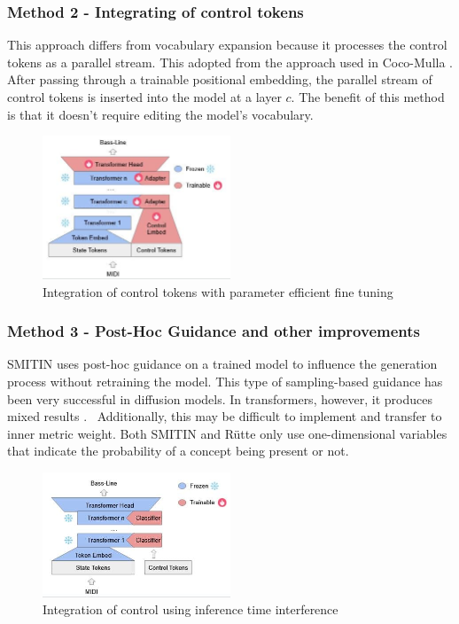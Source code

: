 \subsubsection{Method 2 - Integrating of control tokens} 

This approach differs from vocabulary expansion because it processes the control tokens as a parallel stream. This adopted from the approach used in Coco-Mulla \cite{Lin_cocomulla_2024}. After passing through a trainable positional embedding, the parallel stream of control tokens is inserted into the model at a layer $c$. The benefit of this method is that it doesn't require editing the model's vocabulary. 
 
\begin{figure}[H]
    \centering
    \includegraphics[width=0.5\textwidth]{IMAGES/ControlTokensLora.jpg} 
    \caption{Integration of control tokens with parameter efficient fine tuning}
    \label{fig:controltok}
\end{figure}

\subsubsection{Method 3 - Post-Hoc Guidance and other improvements}

SMITIN\cite{Koo_Wichern_Germain_SMITIN_2024} uses post-hoc guidance on a trained model to influence the generation process without retraining the model. This type of sampling-based guidance has been very successful in diffusion models. In transformers, however, it produces mixed results \cite{language_guide_rutte_2024}.  Additionally, this may be difficult to implement and transfer to inner metric weight. Both SMITIN and Rütte\cite{language_guide_rutte_2024} only use one-dimensional variables that indicate the probability of a concept being present or not. 

\begin{figure}[H]
    \centering
    \includegraphics[width=0.5\textwidth]{IMAGES/adhoccontrol.jpg} 
    \caption{Integration of control using inference time interference}
    \label{fig:adhoccontrol}
\end{figure}

